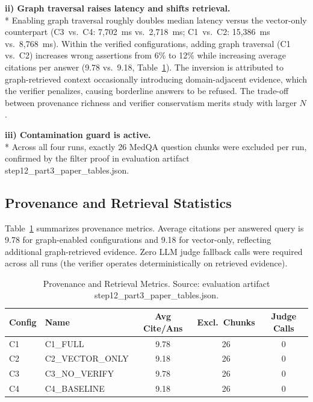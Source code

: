 \documentclass[conference]{IEEEtran}
\begin{document}
\noindent\textbf{ii) Graph traversal raises latency and shifts retrieval.}\\*
Enabling graph
traversal roughly doubles median latency versus the vector-only counterpart
(C3~vs.~C4: 7{,}702~ms vs.\ 2{,}718~ms; C1~vs.~C2: 15{,}386~ms
vs.\ 8{,}768~ms). Within the verified configurations, adding graph traversal
(C1 vs.~C2) increases wrong assertions from 6\% to 12\% while increasing
average citations per answer (9.78 vs.\ 9.18, Table~\ref{tab:provenance}).
The inversion is attributed to graph-retrieved context occasionally introducing
domain-adjacent evidence, which the verifier penalizes, causing borderline
answers to be refused. The trade-off between provenance richness and verifier
conservatism merits study with larger $N$.

\noindent\textbf{iii) Contamination guard is active.}\\*
Across all four runs, exactly 26
MedQA question chunks were excluded per run, confirmed by the filter proof
in evaluation artifact step12\_part3\_paper\_tables.json.

\subsection{Provenance and Retrieval Statistics}

Table~\ref{tab:provenance} summarizes provenance metrics. Average citations per
answered query is 9.78 for graph-enabled configurations and 9.18 for
vector-only, reflecting additional graph-retrieved evidence. Zero LLM judge
fallback calls were required across all runs (the verifier operates
deterministically on retrieved evidence).

\begin{table}[!t]
\caption{Provenance and Retrieval Metrics.
  Source: evaluation artifact step12\_part3\_paper\_tables.json.}
\label{tab:provenance}
\centering
\setlength{\tabcolsep}{4pt}
\renewcommand{\arraystretch}{1.2}
\begin{tabular}{@{}llccc@{}}
\toprule
\textbf{Config} & \textbf{Name} & \textbf{Avg Cite/Ans} &
\textbf{Excl.\ Chunks} & \textbf{Judge Calls}\\
\midrule
C1 & C1\_FULL         & 9.78 & 26 & 0 \\
C2 & C2\_VECTOR\_ONLY & 9.18 & 26 & 0 \\
C3 & C3\_NO\_VERIFY   & 9.78 & 26 & 0 \\
C4 & C4\_BASELINE     & 9.18 & 26 & 0 \\
\bottomrule
\end{tabular}
\end{table}
\end{document}
